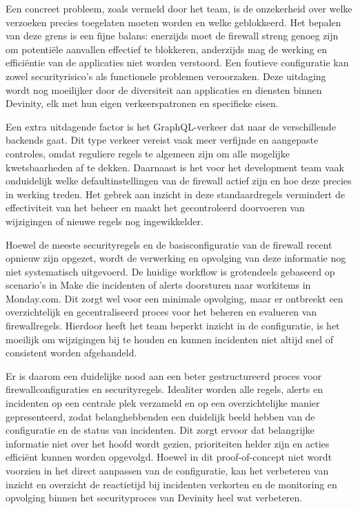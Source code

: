 Een concreet probleem, zoals vermeld door het team, is de onzekerheid over welke verzoeken precies toegelaten moeten worden en welke geblokkeerd. Het bepalen van deze grens is een fijne balans: enerzijds moet de firewall streng genoeg zijn om potentiële aanvallen effectief te blokkeren, anderzijds mag de werking en efficiëntie van de applicaties niet worden verstoord. Een foutieve configuratie kan zowel securityrisico’s als functionele problemen veroorzaken. Deze uitdaging wordt nog moeilijker door de diversiteit aan applicaties en diensten binnen Devinity, elk met hun eigen verkeerspatronen en specifieke eisen.

Een extra uitdagende factor is het GraphQL-verkeer dat naar de verschillende backends gaat. Dit type verkeer vereist vaak meer verfijnde en aangepaste controles, omdat reguliere regels te algemeen zijn om alle mogelijke kwetsbaarheden af te dekken. Daarnaast is het voor het development team vaak onduidelijk welke defaultinstellingen van de firewall actief zijn en hoe deze precies in werking treden. Het gebrek aan inzicht in deze standaardregels vermindert de effectiviteit van het beheer en maakt het gecontroleerd doorvoeren van wijzigingen of nieuwe regels nog ingewikkelder.

Hoewel de meeste securityregels en de basisconfiguratie van de firewall recent opnieuw zijn opgezet, wordt de verwerking en opvolging van deze informatie nog niet systematisch uitgevoerd. De huidige workflow is grotendeels gebaseerd op scenario’s in Make die incidenten of alerts doorsturen naar workitems in Monday.com. Dit zorgt wel voor een minimale opvolging, maar er ontbreekt een overzichtelijk en gecentraliseerd proces voor het beheren en evalueren van firewallregels. Hierdoor heeft het team beperkt inzicht in de configuratie, is het moeilijk om wijzigingen bij te houden en kunnen incidenten niet altijd snel of consistent worden afgehandeld.

Er is daarom een duidelijke nood aan een beter gestructureerd proces voor firewallconfiguraties en securityregels. Idealiter worden alle regels, alerts en incidenten op een centrale plek verzameld en op een overzichtelijke manier gepresenteerd, zodat belanghebbenden een duidelijk beeld hebben van de configuratie en de status van incidenten. Dit zorgt ervoor dat belangrijke informatie niet over het hoofd wordt gezien, prioriteiten helder zijn en acties efficiënt kunnen worden opgevolgd. Hoewel in dit proof-of-concept niet wordt voorzien in het direct aanpassen van de configuratie, kan het verbeteren van inzicht en overzicht de reactietijd bij incidenten verkorten en de monitoring en opvolging binnen het securityproces van Devinity heel wat verbeteren.

